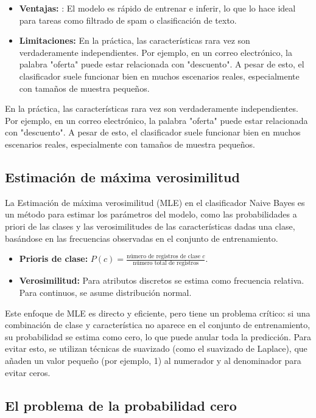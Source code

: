 \begin{itemize}
    \item \textbf{Ventajas:} : El modelo es rápido de entrenar e inferir, lo que lo hace ideal para tareas como filtrado de spam o clasificación de texto. 
    \item \textbf{Limitaciones:} En la práctica, las características rara vez son verdaderamente independientes. Por ejemplo, en un correo electrónico, la palabra "oferta" puede estar relacionada con "descuento". A pesar de esto, el clasificador suele funcionar bien en muchos escenarios reales, especialmente con tamaños de muestra pequeños. 
\end{itemize}
En la práctica, las características rara vez son verdaderamente independientes. Por ejemplo, en un correo electrónico, la palabra "oferta" puede estar relacionada con "descuento". A pesar de esto, el clasificador suele funcionar bien en muchos escenarios reales, especialmente con tamaños de muestra pequeños. 

\subsection{Estimación de máxima verosimilitud}

La Estimación de máxima verosimilitud (MLE) en el clasificador Naive Bayes es un método para estimar los parámetros del modelo, como las probabilidades a priori de las clases y las verosimilitudes de las características dadas una clase, basándose en las frecuencias observadas en el conjunto de entrenamiento. 
\begin{itemize}
    \item \textbf{Prioris de clase:} $P(c) = \frac{\text{número de registros de clase } c}{\text{número total de registros}}$.
    \item \textbf{Verosimilitud:} Para atributos discretos se estima como frecuencia relativa. Para continuos, se asume distribución normal.
\end{itemize}

Este enfoque de MLE es directo y eficiente, pero tiene un problema crítico: si una combinación de clase y característica no aparece en el conjunto de entrenamiento, su probabilidad se estima como cero, lo que puede anular toda la predicción. Para evitar esto, se utilizan técnicas de suavizado (como el suavizado de Laplace), que añaden un valor pequeño (por ejemplo, 1) al numerador y al denominador para evitar ceros. 

\subsection{El problema de la probabilidad cero}

